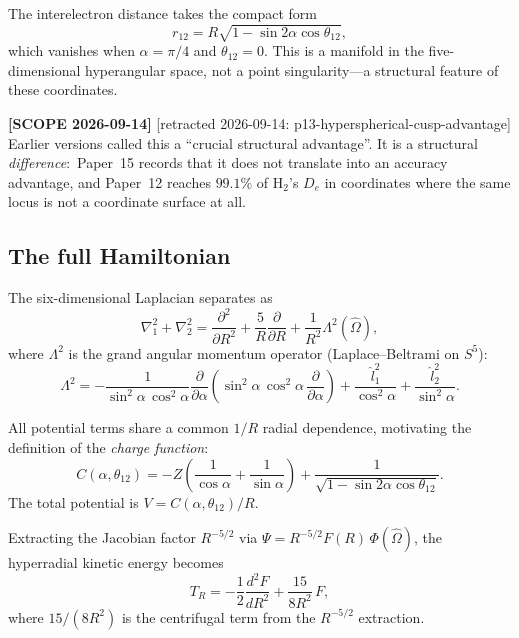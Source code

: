 \documentclass[aps,pra,twocolumn,superscriptaddress,longbibliography]{revtex4-2}
\begin{document}
The interelectron distance takes the compact form
\begin{equation}
  r_{12} = R\sqrt{1 - \sin 2\alpha\cos\theta_{12}},
  \label{eq:r12}
\end{equation}
which vanishes when $\alpha = \pi/4$ and $\theta_{12} = 0$.  This is
a manifold in the five-dimensional hyperangular space, not a point
singularity---a structural feature of these coordinates.

\textbf{[SCOPE 2026-09-14]}
[retracted 2026-09-14: p13-hyperspherical-cusp-advantage]  Earlier versions
called this a ``crucial structural advantage''.  It is a structural \emph{difference}:\ Paper~15
records that it does not translate into an accuracy advantage, and
Paper~12 reaches $99.1\%$ of H$_2$'s $D_e$ in coordinates where the same
locus is not a coordinate surface at all.

\subsection{The full Hamiltonian}

The six-dimensional Laplacian separates as~\cite{Lin1995}
\begin{equation}
  \nabla_1^2 + \nabla_2^2 = \frac{\partial^2}{\partial R^2}
  + \frac{5}{R}\frac{\partial}{\partial R}
  + \frac{1}{R^2}\Lambda^2(\hat{\Omega}),
  \label{eq:laplacian}
\end{equation}
where $\Lambda^2$ is the grand angular momentum operator
(Laplace--Beltrami on $S^5$):
\begin{equation}
  \Lambda^2 = -\frac{1}{\sin^2\!\alpha\,\cos^2\!\alpha}
  \frac{\partial}{\partial\alpha}
  \!\left(\sin^2\!\alpha\,\cos^2\!\alpha\,
  \frac{\partial}{\partial\alpha}\right)
  + \frac{\hat{l}_1^2}{\cos^2\!\alpha}
  + \frac{\hat{l}_2^2}{\sin^2\!\alpha}.
  \label{eq:Lambda2}
\end{equation}

All potential terms share a common $1/R$ radial dependence,
motivating the definition of the \emph{charge function}:
\begin{equation}
  C(\alpha, \theta_{12}) = -Z\!\left(\frac{1}{\cos\alpha}
  + \frac{1}{\sin\alpha}\right)
  + \frac{1}{\sqrt{1 - \sin 2\alpha\cos\theta_{12}}}.
  \label{eq:charge_function}
\end{equation}
The total potential is $V = C(\alpha, \theta_{12})/R$.

Extracting the Jacobian factor $R^{-5/2}$ via $\Psi = R^{-5/2}
F(R)\,\Phi(\hat{\Omega})$, the hyperradial kinetic energy
becomes~\cite{Macek1968}
\begin{equation}
  T_R = -\frac{1}{2}\frac{d^2F}{dR^2}
  + \frac{15}{8R^2}\,F,
  \label{eq:T_R}
\end{equation}
where $15/(8R^2)$ is the centrifugal term from the $R^{-5/2}$
extraction.
\end{document}
